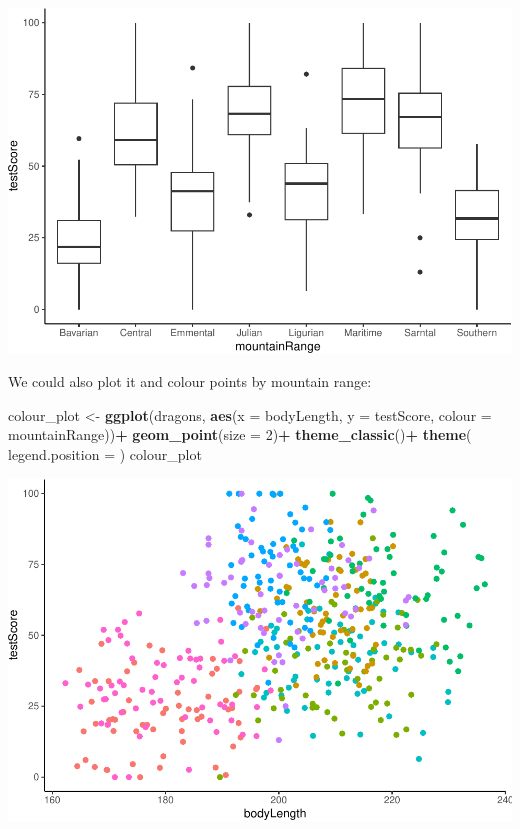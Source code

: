 \documentclass[
]{article}
\newenvironment{Shaded}{\begin{snugshade}}{\end{snugshade}}
\newcommand{\AttributeTok}[1]{\textcolor[rgb]{0.13,0.29,0.53}{#1}}
\newcommand{\DecValTok}[1]{\textcolor[rgb]{0.00,0.00,0.81}{#1}}
\newcommand{\FunctionTok}[1]{\textcolor[rgb]{0.13,0.29,0.53}{\textbf{#1}}}
\newcommand{\NormalTok}[1]{#1}
\newcommand{\OtherTok}[1]{\textcolor[rgb]{0.56,0.35,0.01}{#1}}
\newcommand{\SpecialCharTok}[1]{\textcolor[rgb]{0.81,0.36,0.00}{\textbf{#1}}}
\newcommand{\StringTok}[1]{\textcolor[rgb]{0.31,0.60,0.02}{#1}}
\begin{document}
\includegraphics{Introduction-to-linear-mixed-models_files/figure-latex/unnamed-chunk-8-2.pdf}

We could also plot it and colour points by mountain range:

\begin{Shaded}
\begin{Highlighting}[]
\NormalTok{colour\_plot }\OtherTok{\textless{}{-}} \FunctionTok{ggplot}\NormalTok{(dragons, }\FunctionTok{aes}\NormalTok{(}\AttributeTok{x =}\NormalTok{ bodyLength, }\AttributeTok{y =}\NormalTok{ testScore, }\AttributeTok{colour =}\NormalTok{ mountainRange))}\SpecialCharTok{+}
  \FunctionTok{geom\_point}\NormalTok{(}\AttributeTok{size =} \DecValTok{2}\NormalTok{)}\SpecialCharTok{+}
  \FunctionTok{theme\_classic}\NormalTok{()}\SpecialCharTok{+}
  \FunctionTok{theme}\NormalTok{(}
    \AttributeTok{legend.position =} \StringTok{\textquotesingle{}\textquotesingle{}}
\NormalTok{  )}
\NormalTok{colour\_plot}
\end{Highlighting}
\end{Shaded}

\includegraphics{Introduction-to-linear-mixed-models_files/figure-latex/unnamed-chunk-9-1.pdf}
\end{document}
